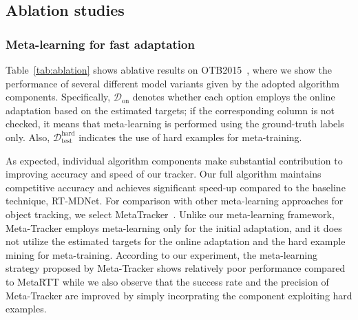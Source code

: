 \documentclass[letterpaper]{article} %
\def \dataonline{\mathcal{D}_\text{on}}
\def \dataval{\mathcal{D}_\text{test}}
\begin{document}

\subsection{Ablation studies}

\subsubsection{Meta-learning for fast adaptation}
Table~\ref{tab:ablation} shows ablative results on OTB2015~\cite{wu2013online}, where we show the performance of several different model variants given by the adopted algorithm components.
Specifically, $\dataonline$ denotes whether each option employs the online adaptation based on the estimated targets; if the corresponding column is not checked, it means that meta-learning is performed using the ground-truth labels only.
Also, $\dataval^\text{hard}$ indicates the use of hard examples for meta-training.

As expected, individual algorithm components make substantial contribution to improving accuracy and speed of our tracker.
Our full algorithm maintains competitive accuracy and achieves significant speed-up compared to the baseline technique, RT-MDNet.
For comparison with other meta-learning approaches for object tracking, we select MetaTracker~\cite{park2018metatracker}.
Unlike our meta-learning framework, Meta-Tracker employs meta-learning only for the initial adaptation, and it does not utilize the estimated targets for the online adaptation and the hard example mining for meta-training.
According to our experiment, the meta-learning strategy proposed by Meta-Tracker shows relatively poor performance compared to MetaRTT while we also observe that the success rate and the precision of Meta-Tracker are improved by simply incorprating the component exploiting hard examples.
\end{document}
